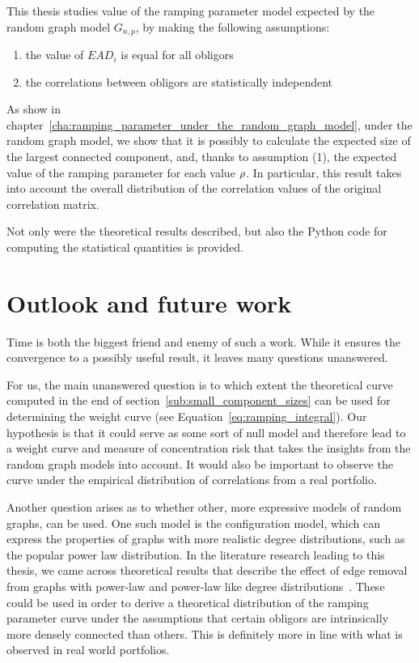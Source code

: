 This thesis studies value of the ramping parameter model expected by the random graph model $G_{n,p}$, by making the following assumptions:
\begin{enumerate}
	\item the value of $EAD_i$ is equal for all obligors
	\item the correlations between obligors are statistically independent
\end{enumerate}
As show in chapter~\ref{cha:ramping_parameter_under_the_random_graph_model}, under the random graph model, we show that it is possibly to calculate the expected size of the largest connected component, and, thanks to assumption (1), the expected value of the ramping parameter for each value $\rho$.
In particular, this result takes into account the overall distribution of the correlation values of the original correlation matrix.

Not only were the theoretical results described, but also the Python code for computing the statistical quantities is provided.


\section{Outlook and future work}
\label{sec:future_work}

Time is both the biggest friend and enemy of such a work.
While it ensures the convergence to a possibly useful result, it leaves many questions unanswered. 

For us, the main unanswered question is to which extent the theoretical curve computed in the end of section~\ref{sub:small_component_sizes} can be used for determining the weight curve (see Equation~\vref{eq:ramping_integral}).
Our hypothesis is that it could serve as some sort of null model and therefore lead to a weight curve and measure of concentration risk that takes the insights from the random graph models into account.
It would also be important to observe the curve under the empirical distribution of correlations from a real portfolio.

Another question arises as to whether other, more expressive models of random graphs, can be used.
One such model is the configuration model, which can express the properties of graphs with more realistic degree distributions, such as the popular power law distribution.
In the literature research leading to this thesis, we came across theoretical results that describe the
effect of edge removal from graphs with power-law and power-law like degree distributions~\cite{dubois2012effect}.
These could be used in order to derive a theoretical distribution of the ramping parameter curve under the assumptions that certain obligors are intrinsically more densely connected than others.
This is definitely more in line with what is observed in real world portfolios.


